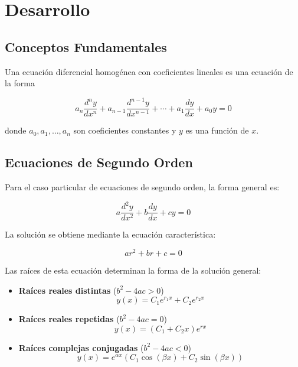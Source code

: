 \newpage
\section{Desarrollo}

\subsection{Conceptos Fundamentales}

Una ecuación diferencial homogénea con coeficientes lineales es una ecuación de la forma

\begin{equation}
    a_n \frac{d^n y}{dx^n} + a_{n-1} \frac{d^{n-1} y}{dx^{n-1}} + \cdots + a_1 \frac{dy}{dx} + a_0 y = 0
\end{equation}

donde $a_0, a_1, \ldots, a_n$ son coeficientes constantes y $y$ es una función de $x$.


\subsection{Ecuaciones de Segundo Orden}

Para el caso particular de ecuaciones de segundo orden, la forma general es:

\begin{equation}
    a \frac{d^2 y}{dx^2} + b \frac{dy}{dx} + c y = 0
\end{equation}

La solución se obtiene mediante la ecuación característica:

\begin{equation}
    ar^2 + br + c = 0
\end{equation}

Las raíces de esta ecuación determinan la forma de la solución general:

\begin{itemize}

\item \textbf{Raíces reales distintas} ($b^2 - 4ac > 0$)
\begin{equation}
    y(x) = C_1 e^{r_1 x} + C_2 e^{r_2 x}
\end{equation}

\item \textbf{Raíces reales repetidas} ($b^2 - 4ac = 0$)
\begin{equation}
    y(x) = (C_1 + C_2 x) e^{rx}
\end{equation}

\item \textbf{Raíces complejas conjugadas} ($b^2 - 4ac < 0$)
\begin{equation}
    y(x) = e^{\alpha x} (C_1 \cos(\beta x) + C_2 \sin(\beta x))
\end{equation}

\end{itemize}

